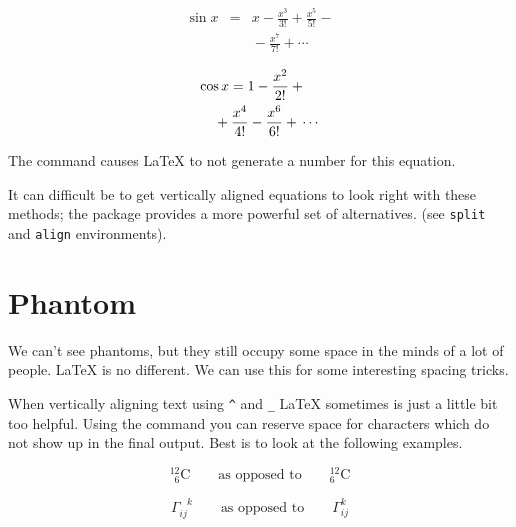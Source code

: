 \begin{example}
{\setlength\arraycolsep{2pt}
\begin{eqnarray}
\sin x & = & x -\frac{x^{3}}{3!}
     +\frac{x^{5}}{5!}-{}
                    \nonumber\\
 & & {}-\frac{x^{7}}{7!}+{}\cdots
\end{eqnarray}}
\end{example}
\pagebreak[1]

\begin{example}
\begin{eqnarray}
\lefteqn{ \cos x = 1
     -\frac{x^{2}}{2!} +{} }
                    \nonumber\\
 & & {}+\frac{x^{4}}{4!}
     -\frac{x^{6}}{6!}+{}\cdots
\end{eqnarray}
\end{example}

\enlargethispage{\baselineskip}
\noindent The  command causes \LaTeX{} to not generate a number for
this equation.

It can difficult be to get vertically aligned equations to look right
with these methods; the package  provides a more
powerful set of alternatives. (see \verb|split| and \verb|align| environments).

\section{Phantom}

We can't see phantoms, but they still occupy some space in the minds of a
lot of people. \LaTeX{} is no different. We can use this for
some interesting spacing tricks.

When vertically aligning text using \verb|^| and \verb|_| \LaTeX{} sometimes
is just a little bit too helpful. Using the  command you can
reserve space for characters which do not show up in the final output. Best
is to look at the following examples.

\begin{example}
\begin{displaymath}
{}^{12}_{\phantom{1}6}\textrm{C}
\qquad \textrm{as opposed to} \qquad
{}^{12}_{6}\textrm{C}
\end{displaymath}
\end{example}

\begin{example}
\begin{displaymath} 
\Gamma_{ij}^{\phantom{ij}k}
\qquad \textrm{as opposed to} \qquad
\Gamma_{ij}^{k}
\end{displaymath}  
\end{example}

